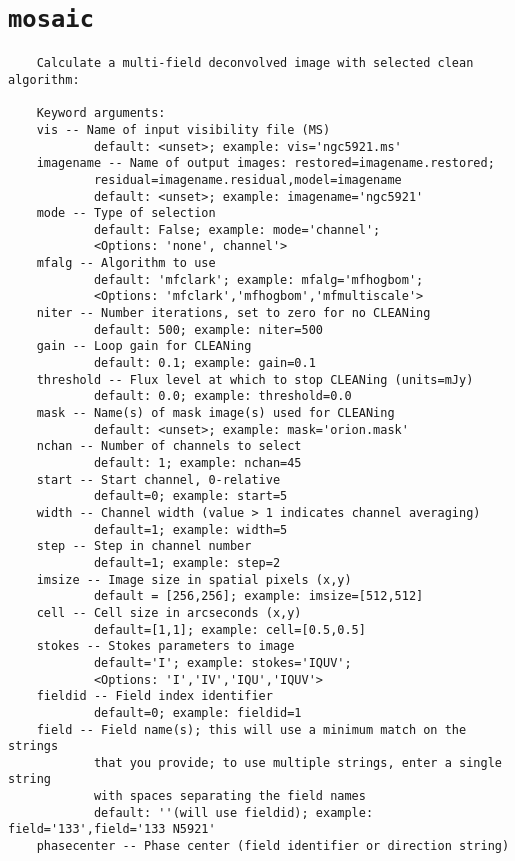 \section{{\tt mosaic}}
\label{section:tasks.mosaic}

\small
\begin{verbatim}
    Calculate a multi-field deconvolved image with selected clean algorithm:
    
    Keyword arguments:
    vis -- Name of input visibility file (MS)
            default: <unset>; example: vis='ngc5921.ms'
    imagename -- Name of output images: restored=imagename.restored;
            residual=imagename.residual,model=imagename
            default: <unset>; example: imagename='ngc5921'
    mode -- Type of selection 
            default: False; example: mode='channel'; 
            <Options: 'none', channel'>
    mfalg -- Algorithm to use
            default: 'mfclark'; example: mfalg='mfhogbom'; 
            <Options: 'mfclark','mfhogbom','mfmultiscale'>
    niter -- Number iterations, set to zero for no CLEANing
            default: 500; example: niter=500
    gain -- Loop gain for CLEANing
            default: 0.1; example: gain=0.1
    threshold -- Flux level at which to stop CLEANing (units=mJy)
            default: 0.0; example: threshold=0.0
    mask -- Name(s) of mask image(s) used for CLEANing
            default: <unset>; example: mask='orion.mask'
    nchan -- Number of channels to select
            default: 1; example: nchan=45
    start -- Start channel, 0-relative
            default=0; example: start=5
    width -- Channel width (value > 1 indicates channel averaging)
            default=1; example: width=5
    step -- Step in channel number
            default=1; example: step=2      
    imsize -- Image size in spatial pixels (x,y)
            default = [256,256]; example: imsize=[512,512]
    cell -- Cell size in arcseconds (x,y)
            default=[1,1]; example: cell=[0.5,0.5]
    stokes -- Stokes parameters to image
            default='I'; example: stokes='IQUV'; 
            <Options: 'I','IV','IQU','IQUV'>
    fieldid -- Field index identifier
            default=0; example: fieldid=1
    field -- Field name(s); this will use a minimum match on the strings
            that you provide; to use multiple strings, enter a single string
            with spaces separating the field names
            default: ''(will use fieldid); example: field='133',field='133 N5921'
    phasecenter -- Phase center (field identifier or direction string)

\end{verbatim}
